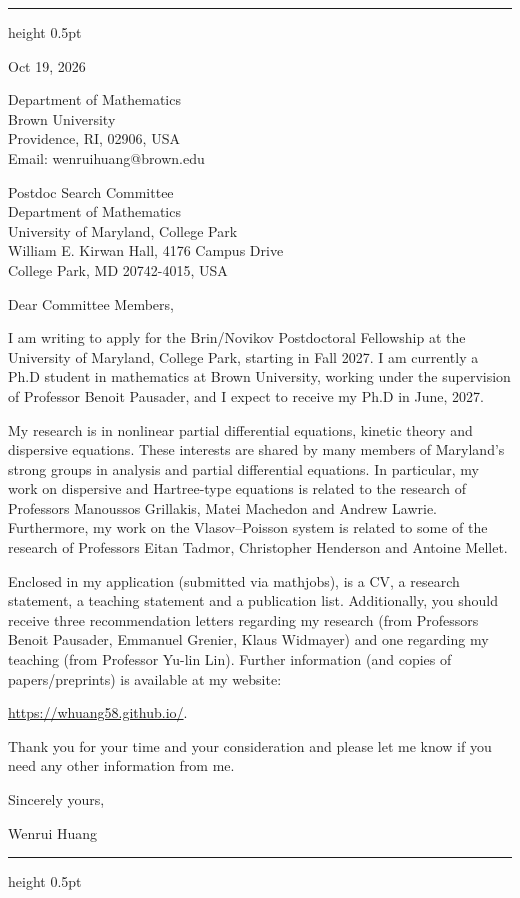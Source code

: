 \documentclass[10pt]{article}
\begin{document}
 
 
\vspace{0.08in}
\hrule height 0.5pt
 
\vspace{0.47in}
\hfill
\begin{minipage}{2.27in}
Oct 19, 2026
 
\vspace{0.16in}
Department of Mathematics\\
Brown University\\
Providence, RI, 02906, USA\\
Email: wenrui\textunderscore huang@brown.edu
\end{minipage}
 
\vspace{0.30in}
Postdoc Search Committee\\
Department of Mathematics\\
University of Maryland, College Park\\
William E. Kirwan Hall, 4176 Campus Drive\\
College Park, MD 20742-4015, USA
 
\vspace{0.16in}
Dear Committee Members,
 
I am writing to apply for the Brin/Novikov Postdoctoral Fellowship  at the
University of Maryland, College Park, starting in Fall 2027. I am currently a Ph.D student in mathematics at Brown University, working under the supervision of Professor Benoit Pausader, and I expect to receive my Ph.D in June, 2027. 
 
My research is in nonlinear partial differential equations, kinetic theory and dispersive equations.  These interests are shared by many members of Maryland's strong groups in analysis and partial differential equations. In particular, my work on dispersive and Hartree-type equations is related to the research of Professors Manoussos Grillakis, Matei Machedon and Andrew Lawrie. Furthermore, my work on the Vlasov--Poisson system is related to some of the research of Professors Eitan Tadmor, Christopher Henderson and Antoine Mellet.
 
Enclosed in my application (submitted via mathjobs), is a CV, a research
statement, a teaching statement and a publication list. Additionally, you
should receive three recommendation letters regarding my research (from
Professors Benoit Pausader, Emmanuel Grenier, Klaus Widmayer) and one
regarding my teaching (from Professor Yu-lin Lin). Further information
(and copies of papers/preprints) is available at my website:

\url{https://whuang58.github.io/}.
 
 \medskip
Thank you for your time and your consideration and please let me know if you
need any other information from me.
 
\vspace{0.12in}
Sincerely yours,
 

Wenrui Huang
 
\vfill
\hrule height 0.5pt
 
\end{document}
